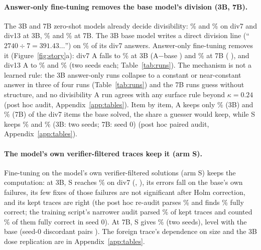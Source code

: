 \documentclass{article}
\theoremstyle{definition}
\begin{document}
\paragraph{Answer-only fine-tuning removes the base model's division (3B, 7B).} The 3B and 7B zero-shot models already decide divisibility: \threeBdivsevenBase\% and \threeBdivthirteenBase\% on div7 and div13 at 3B, \sevenBdivsevenBase\% and \sevenBdivthirteenBase\% at 7B. The 3B base model writes a direct division line (``$2740 \div 7 = 391.43\ldots$'') on \threeBbasedivsevenDirect\% of its div7 answers. Answer-only fine-tuning removes it (Figure~\ref{fig:story}a): div7 A falls to \threeBdivsevenA\% at 3B (A$-$base \threeBdivsevenBootABaseDiff{} \threeBdivsevenBootABaseCi) and \sevenBdivsevenA\% at 7B (\sevenBdivsevenBootABaseDiff{} \sevenBdivsevenBootABaseCi), and div13 A to \threeBdivthirteenA\% and \sevenBdivthirteenA\% (two seeds each; Table~\ref{tab:runs}). The mechanism is not a learned rule: the 3B answer-only runs collapse to a constant or near-constant answer in three of four runs (Table~\ref{tab:runs}) and the 7B runs guess without structure, and no divisibility A run agrees with any surface rule beyond $\kappa=0.24$ (post hoc audit, Appendix~\ref{app:tables}). Item by item, A keeps only \erThreeBdivsevenAkeep\% (3B) and \erSevenBdivsevenAkeep\% (7B) of the div7 items the base solved, the share a guesser would keep, while S keeps \erThreeBdivsevenSkeep\% and \erSevenBdivsevenSkeep\% (3B: two seeds; 7B: seed 0) (post hoc paired audit, Appendix~\ref{app:tables}).

\paragraph{The model's own verifier-filtered traces keep it (arm S).} Fine-tuning on the model's own verifier-filtered solutions (arm S) keeps the computation: at 3B, S reaches \threeBdivsevenS\% on div7 (\threeBdivsevenSsZero, \threeBdivsevenSsOne), its errors fall on the base's own failures, its few fixes of those failures are not significant after Holm correction, and its kept traces are right (the post hoc re-audit parses \threeBselfParsedExt\% and finds \threeBselfCorrectParsedExt\% fully correct; the training script's narrower audit parsed \threeBselfParsed\% of kept traces and counted \threeBselfCorrectAll\% of them fully correct in seed 0). At 7B, S gives \sevenBdivsevenS\% (two seeds), level with the base (seed-0 discordant pairs \sevenBdivsevenSBaseDisc). The foreign trace's dependence on size and the 3B dose replication are in Appendix~\ref{app:tables}.
\end{document}
